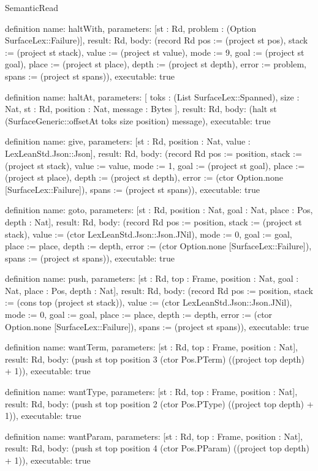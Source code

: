 \begin{lexlean}{SemanticRead}
\begin{semanticmodule}
definition{
  name: haltWith,
  parameters: [st : Rd, problem : (Option SurfaceLex::Failure)],
  result: Rd,
  body: (record Rd {pos := (project st pos), stack := (project st stack), value := (project st value), mode := 9, goal := (project st goal), place := (project st place), depth := (project st depth), error := problem, spans := (project st spans)}),
  executable: true
}

definition{
  name: haltAt,
  parameters: [
    toks : (List SurfaceLex::Spanned),
    size : Nat,
    st : Rd,
    position : Nat,
    message : Bytes
  ],
  result: Rd,
  body: (halt st (SurfaceGeneric::offsetAt toks size position) message),
  executable: true
}

definition{
  name: give,
  parameters: [st : Rd, position : Nat, value : LexLeanStd.Json::Json],
  result: Rd,
  body: (record Rd {pos := position, stack := (project st stack), value := value, mode := 1, goal := (project st goal), place := (project st place), depth := (project st depth), error := (ctor Option.none [SurfaceLex::Failure]), spans := (project st spans)}),
  executable: true
}

definition{
  name: goto,
  parameters: [st : Rd, position : Nat, goal : Nat, place : Pos, depth : Nat],
  result: Rd,
  body: (record Rd {pos := position, stack := (project st stack), value := (ctor LexLeanStd.Json::Json.JNil), mode := 0, goal := goal, place := place, depth := depth, error := (ctor Option.none [SurfaceLex::Failure]), spans := (project st spans)}),
  executable: true
}

definition{
  name: push,
  parameters: [st : Rd, top : Frame, position : Nat, goal : Nat, place : Pos, depth : Nat],
  result: Rd,
  body: (record Rd {pos := position, stack := (cons top (project st stack)), value := (ctor LexLeanStd.Json::Json.JNil), mode := 0, goal := goal, place := place, depth := depth, error := (ctor Option.none [SurfaceLex::Failure]), spans := (project st spans)}),
  executable: true
}

definition{
  name: wantTerm,
  parameters: [st : Rd, top : Frame, position : Nat],
  result: Rd,
  body: (push st top position 3 (ctor Pos.PTerm) ((project top depth) + 1)),
  executable: true
}

definition{
  name: wantType,
  parameters: [st : Rd, top : Frame, position : Nat],
  result: Rd,
  body: (push st top position 2 (ctor Pos.PType) ((project top depth) + 1)),
  executable: true
}

definition{
  name: wantParam,
  parameters: [st : Rd, top : Frame, position : Nat],
  result: Rd,
  body: (push st top position 4 (ctor Pos.PParam) ((project top depth) + 1)),
  executable: true
}


\end{semanticmodule}
\end{lexlean}
